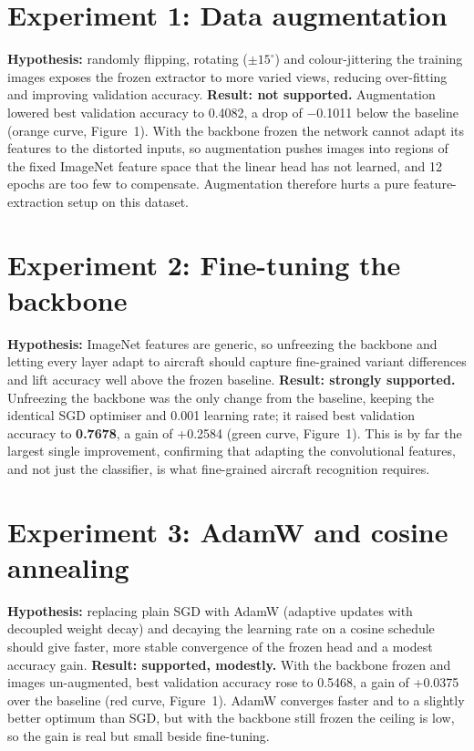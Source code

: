 \documentclass[10pt,a4paper,twocolumn]{article}
\begin{document}
\section{Experiment 1: Data augmentation}
\textbf{Hypothesis:} randomly flipping, rotating ($\pm15^\circ$) and colour-jittering the training
images exposes the frozen extractor to more varied views, reducing over-fitting and improving
validation accuracy. \textbf{Result: not supported.} Augmentation lowered best validation accuracy
to 0.4082, a drop of $-$0.1011 below the baseline (orange curve, Figure~1). With the backbone frozen
the network cannot adapt its features to the distorted inputs, so augmentation pushes images into
regions of the fixed ImageNet feature space that the linear head has not learned, and 12
epochs are too few to compensate. Augmentation therefore hurts a pure feature-extraction setup on
this dataset.

\section{Experiment 2: Fine-tuning the backbone}
\textbf{Hypothesis:} ImageNet features are generic, so unfreezing the backbone and letting every
layer adapt to aircraft should capture fine-grained variant differences and lift accuracy well
above the frozen baseline. \textbf{Result: strongly supported.} Unfreezing the backbone was the
only change from the baseline, keeping the identical SGD optimiser and 0.001 learning rate; it
raised best validation accuracy to \textbf{0.7678}, a gain of +0.2584 (green curve, Figure~1). This is
by far the largest single improvement, confirming that adapting the convolutional features, and
not just the classifier, is what fine-grained aircraft recognition requires.

\section{Experiment 3: AdamW and cosine annealing}
\textbf{Hypothesis:} replacing plain SGD with AdamW (adaptive updates with decoupled weight decay)
and decaying the learning rate on a cosine schedule should give faster, more stable convergence of
the frozen head and a modest accuracy gain. \textbf{Result: supported, modestly.} With the backbone
frozen and images un-augmented, best validation accuracy rose to 0.5468, a gain of +0.0375 over
the baseline (red curve, Figure~1). AdamW converges faster and to a slightly better optimum than
SGD, but with the backbone still frozen the ceiling is low, so the gain is real but small beside
fine-tuning.
\end{document}
